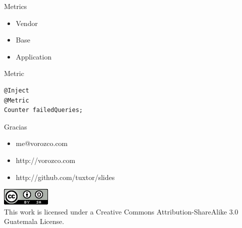 \documentclass{beamer}
\begin{document}
\begin{frame}{Metrics}

\begin{itemize}
\item Vendor
\item Base
\item Application
\end{itemize}

\end{frame}

\begin{frame}[fragile]{Metric}
\begin{lstlisting}
@Inject
@Metric
Counter failedQueries;
\end{lstlisting}
\end{frame}

\begin{frame}{Gracias}
\begin{itemize}
\item me@vorozco.com
\item http://vorozco.com
\item http://github.com/tuxtor/slides
\end{itemize}
\begin{center}
\includegraphics[width=0.1\linewidth]{Images/cclogo}
\\
This work is licensed under a Creative Commons Attribution-ShareAlike 3.0 Guatemala License.
\end{center}
\end{frame}
\end{document}
